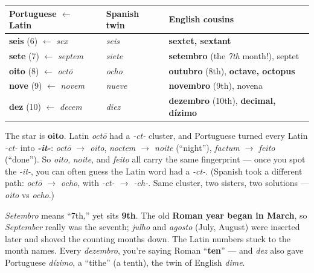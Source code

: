 \begin{cousinweb}
\noindent
\begin{tabularx}{\linewidth}{@{}>{\raggedright\arraybackslash}X>{\raggedright\arraybackslash}X>{\raggedright\arraybackslash}X@{}}
\toprule
\textbf{Portuguese $\leftarrow$ Latin} & \textbf{Spanish twin} & \textbf{English cousins} \\
\midrule
\textbf{seis} (6) $\leftarrow$ \emph{sex} & \emph{seis} & \textbf{sextet, sextant} \\
\textbf{sete} (7) $\leftarrow$ \emph{septem} & \emph{siete} & \textbf{setembro} (the \emph{7th} month!), septet \\
\textbf{oito} (8) $\leftarrow$ \emph{octō} & \emph{ocho} & \textbf{outubro} (8th), \textbf{octave, octopus} \\
\textbf{nove} (9) $\leftarrow$ \emph{novem} & \emph{nueve} & \textbf{novembro} (9th), novena \\
\textbf{dez} (10) $\leftarrow$ \emph{decem} & \emph{diez} & \textbf{dezembro} (10th), \textbf{decimal, dízimo} \\
\bottomrule
\end{tabularx}

The star is \textbf{oito}. Latin \emph{octō} had a \emph{-ct-} cluster, and Portuguese turned every Latin \emph{-ct-} into \emph{\textbf{-it-}}: \emph{octō $\to$ oito}, \emph{noctem $\to$ noite} (\textquotedblleft{}night\textquotedblright{}), \emph{factum $\to$ feito} (\textquotedblleft{}done\textquotedblright{}). So \emph{oito}, \emph{noite}, and \emph{feito} all carry the same fingerprint — once you spot the \emph{-it-}, you can often guess the Latin word had a \emph{-ct-}. (Spanish took a different path: \emph{octō $\to$ ocho}, with \emph{-ct- $\to$ -ch-}. Same cluster, two sisters, two solutions — \emph{oito} vs \emph{ocho}.)
\end{cousinweb}

\begin{grammarlens}[title={Grammar Lens: why the months are \textquotedblleft{}off by two\textquotedblright{}}]
\emph{Setembro} means \textquotedblleft{}7th,\textquotedblright{} yet sits \textbf{9th}. The old \textbf{Roman year began in March}, so \emph{September} really was the seventh; \emph{julho} and \emph{agosto} (July, August) were inserted later and shoved the counting months down. The Latin numbers stuck to the month names. Every \emph{dezembro}, you're saying Roman \textquotedblleft{}\textbf{ten}\textquotedblright{} — and \emph{dez} also gave Portuguese \emph{dízimo}, a \textquotedblleft{}tithe\textquotedblright{} (a tenth), the twin of English \emph{dime}.
\end{grammarlens}


